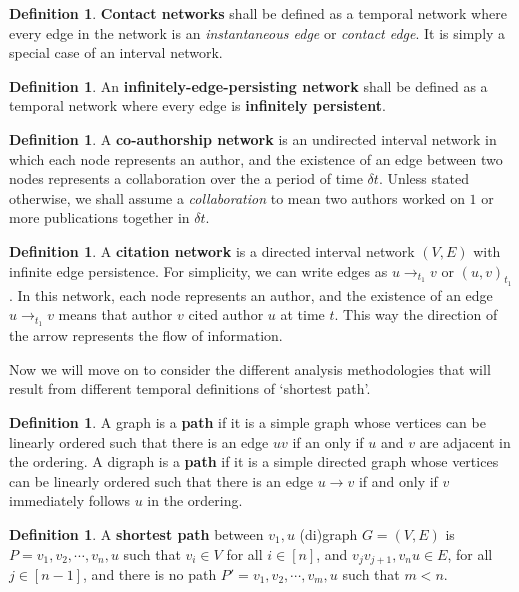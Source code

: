 \documentclass{article}
\theoremstyle{definition}
\newtheorem{defn}[thm]{Definition}
\numberwithin{thm}{subsection}
\begin{document}
\begin{defn}
  \textbf{Contact networks} shall be defined as a temporal network where
  every edge in the network is an \textit{instantaneous edge} or \textit{contact
  edge}. It is simply a special case of an interval network.
\end{defn}

\begin{defn}
  An \textbf{infinitely-edge-persisting network} shall be defined as a temporal
  network where every edge is \textbf{infinitely persistent}.
\end{defn}

\begin{defn}
  A \textbf{co-authorship network} is an undirected interval network in which
  each node represents an author, and the existence of an edge between two nodes
  represents a collaboration over the a period of time $\delta t$. Unless stated
  otherwise, we shall assume a \textit{collaboration} to mean two authors worked
  on $1$ or more publications together in $\delta t$.
\end{defn}

\begin{defn}
  A \textbf{citation network} is a directed interval network $(V,E)$ with
  infinite edge persistence. For simplicity, we can write edges as $u \to_{t_1}
  v$ or $(u,v)_{t_1}$.  In this network, each node represents an author, and the
  existence of an edge $u \to_{t_1} v$ means that author $v$ cited author $u$
  at time $t$. This way the direction of the arrow represents the flow of
  information.
\end{defn}


Now we will move on to consider the different analysis methodologies that will
result from different temporal definitions of `shortest path'.

\begin{defn}
  A graph is a \textbf{path} if it is a simple graph whose vertices can be linearly
  ordered such that there is an edge $uv$ if an only if $u$ and $v$ are adjacent
  in the ordering.
  A digraph is a \textbf{path} if it is a simple directed graph whose vertices
  can be linearly ordered such that there is an edge $u \to v$ if and only if
  $v$ immediately follows $u$ in the ordering.
\end{defn}

\begin{defn}
 A \textbf{shortest path} between $v_1, u$ (di)graph $G = (V,E)$ is
 $P = v_1, v_2, \cdots, v_n, u$ such that $v_i \in V$ for all $i \in [n]$,
 and $v_jv_{j+1}, v_nu \in E$, for all $j \in [n-1]$, and there is no path
 $P' = v_1, v_2, \cdots, v_m, u$ such that $m < n$.
 \end{defn}
\end{document}
